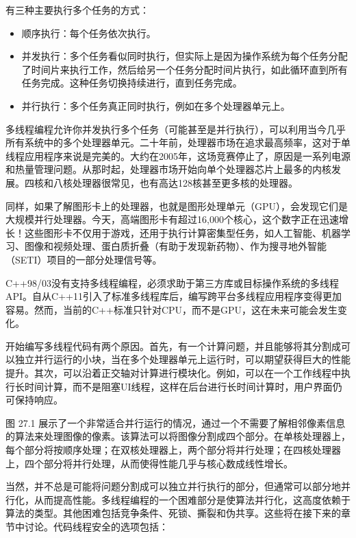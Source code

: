 

有三种主要执行多个任务的方式：

\begin{itemize}
\item
顺序执行：每个任务依次执行。

\item
并发执行：多个任务看似同时执行，但实际上是因为操作系统为每个任务分配了时间片来执行工作，然后给另一个任务分配时间片执行，如此循环直到所有任务完成。这种任务切换持续进行，直到任务完成。

\item
并行执行：多个任务真正同时执行，例如在多个处理器单元上。
\end{itemize}

多线程编程允许你并发执行多个任务（可能甚至是并行执行），可以利用当今几乎所有系统中的多个处理器单元。二十年前，处理器市场在追求最高频率，这对于单线程应用程序来说是完美的。大约在2005年，这场竞赛停止了，原因是一系列电源和热量管理问题。从那时起，处理器市场开始向单个处理器芯片上最多的内核发展。四核和八核处理器很常见，也有高达128核甚至更多核的处理器。

同样，如果了解图形卡上的处理器，也就是图形处理单元（GPU），会发现它们是大规模并行处理器。今天，高端图形卡有超过16,000个核心，这个数字正在迅速增长！这些图形卡不仅用于游戏，还用于执行计算密集型任务，如人工智能、机器学习、图像和视频处理、蛋白质折叠（有助于发现新药物）、作为搜寻地外智能（SETI）项目的一部分处理信号等。

C++98/03没有支持多线程编程，必须求助于第三方库或目标操作系统的多线程API。自从C++11引入了标准多线程库后，编写跨平台多线程应用程序变得更加容易。然而，当前的C++标准只针对CPU，而不是GPU，这在未来可能会发生变化。

开始编写多线程代码有两个原因。首先，有一个计算问题，并且能够将其分割成可以独立并行运行的小块，当在多个处理器单元上运行时，可以期望获得巨大的性能提升。其次，可以沿着正交轴对计算进行模块化。例如，可以在一个工作线程中执行长时间计算，而不是阻塞UI线程，这样在后台进行长时间计算时，用户界面仍可保持响应。

图 27.1 展示了一个非常适合并行运行的情况，通过一个不需要了解相邻像素信息的算法来处理图像的像素。该算法可以将图像分割成四个部分。在单核处理器上，每个部分将按顺序处理；在双核处理器上，两个部分将并行处理；在四核处理器上，四个部分将并行处理，从而使得性能几乎与核心数成线性增长。


当然，并不总是可能将问题分割成可以独立并行执行的部分，但通常可以部分地并行化，从而提高性能。多线程编程的一个困难部分是使算法并行化，这高度依赖于算法的类型。其他困难包括竞争条件、死锁、撕裂和伪共享。这些将在接下来的章节中讨论。代码线程安全的选项包括：

